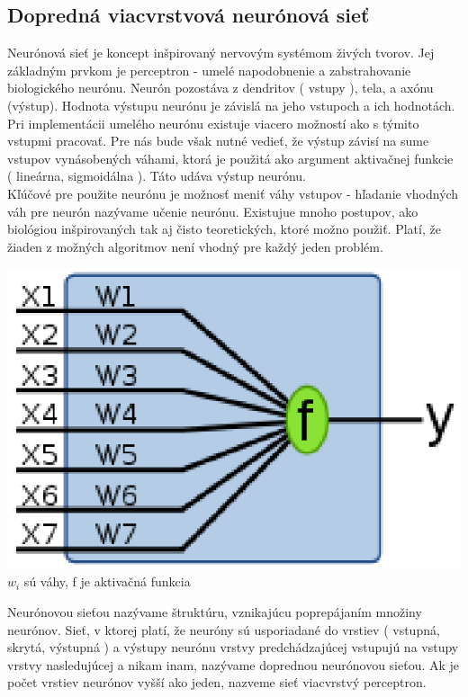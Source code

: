 \documentclass[11pt,a4paper]{article}
\begin{document}
\subsection{Dopredná viacvrstvová neurónová sieť}
Neurónová sieť je koncept inšpirovaný nervovým systémom živých tvorov. Jej základným prvkom je perceptron - umelé napodobnenie a zabstrahovanie biologického neurónu. Neurón pozostáva z dendritov ( vstupy ), tela, a axónu (výstup). Hodnota výstupu neurónu je závislá na jeho vstupoch a ich hodnotách. Pri implementácii umelého neurónu existuje viacero možností ako s týmito vstupmi pracovať. Pre nás bude však nutné vedieť, že výstup závisí na sume vstupov vynásobených váhami, ktorá je použitá ako argument aktivačnej funkcie ( lineárna, sigmoidálna ). Táto udáva výstup neurónu.\\
Kľúčové pre použite neurónu je možnosť meniť váhy vstupov - hľadanie vhodných váh pre neurón nazývame učenie neurónu. Existujue mnoho postupov, ako biológiou inšpirovaných tak aj čisto teoretických, ktoré možno použiť. Platí, že žiaden z možných algoritmov není vhodný pre každý jeden problém.\\
\begin{center}
\includegraphics[scale=0.7]{200px-Perceptron.svg.eps.ps}\\
{\small $w_i$ sú váhy, f je aktivačná funkcia}  
\end{center}
Neurónovou sieťou nazývame štruktúru, vznikajúcu poprepájaním množiny neurónov. 
Sieť, v ktorej platí, že neuróny sú usporiadané do vrstiev ( vstupná, skrytá, výstupná ) a výstupy neurónu vrstvy predchádzajúcej vstupujú na vstupy vrstvy nasledujúcej a nikam inam, nazývame doprednou neurónovou sieťou. Ak je počet vrstiev neurónov vyšší ako jeden, nazveme sieť viacvrstvý perceptron.\\
\end{document}
